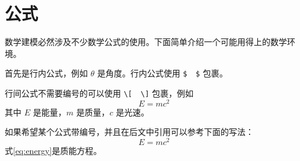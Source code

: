 \documentclass[withoutpreface,bwprint]{cumcmthesis} %
\begin{document}



\section{公式}

数学建模必然涉及不少数学公式的使用。下面简单介绍一个可能用得上的数学环境。

首先是行内公式，例如 $ \theta $ 是角度。行内公式使用 \verb|$  $| 包裹。

行间公式不需要编号的可以使用 \verb|\[  \]| 包裹，例如
\[
E=mc^2
\]
其中 $ E $ 是能量，$ m $ 是质量，$ c $ 是光速。

如果希望某个公式带编号，并且在后文中引用可以参考下面的写法：
\begin{equation}
E=mc^2
\label{eq:energy}
\end{equation}
式\cref{eq:energy}是质能方程。
\end{document}
